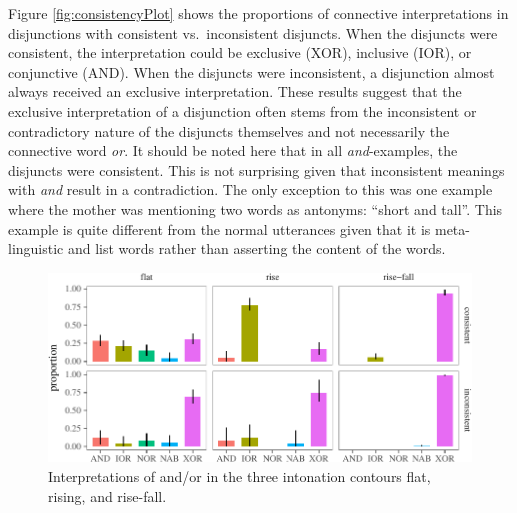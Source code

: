 \documentclass[oneside]{report}
\theoremstyle{definition}
\theoremstyle{definition}
\theoremstyle{definition}
\theoremstyle{remark}
\begin{document}
Figure \ref{fig:consistencyPlot} shows the proportions of connective
interpretations in disjunctions with consistent vs.~inconsistent
disjuncts. When the disjuncts were consistent, the interpretation could
be exclusive (XOR), inclusive (IOR), or conjunctive (AND). When the
disjuncts were inconsistent, a disjunction almost always received an
exclusive interpretation. These results suggest that the exclusive
interpretation of a disjunction often stems from the inconsistent or
contradictory nature of the disjuncts themselves and not necessarily the
connective word \emph{or}. It should be noted here that in all
\emph{and}-examples, the disjuncts were consistent. This is not
surprising given that inconsistent meanings with \emph{and} result in a
contradiction. The only exception to this was one example where the
mother was mentioning two words as antonyms: ``short and tall''. This
example is quite different from the normal utterances given that it is
meta-linguistic and list words rather than asserting the content of the
words.
\begin{figure}[tb]

{\centering \includegraphics{figs/consistencyByintonationPlot-1} 

}

\caption{Interpretations of and/or in the three intonation contours flat, rising, and rise-fall.}\label{fig:consistencyByintonationPlot}
\end{figure}
\newline
\end{document}

